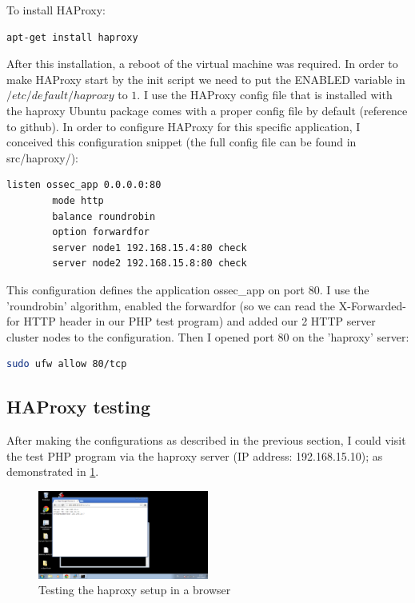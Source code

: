 \documentclass[12pt]{report}
\begin{document}
To install HAProxy:
\begin{lstlisting}[language=bash]
apt-get install haproxy
\end{lstlisting} 
After this installation, a reboot of the virtual machine was required.
In order to make HAProxy start by the init script we need to put the
ENABLED variable in $/etc/default/haproxy$ to $1$.
I use the HAProxy config file that is installed with the haproxy
Ubuntu package comes with a proper config file by default (reference
to github).   
In order to configure HAProxy for this specific application, I conceived
this configuration snippet (the full config file can be found in src/haproxy/):
\begin{lstlisting}[language=bash]
listen ossec_app 0.0.0.0:80
        mode http
        balance roundrobin
        option forwardfor
        server node1 192.168.15.4:80 check
        server node2 192.168.15.8:80 check
\end{lstlisting} 
This configuration defines the application ossec\_app on port 80.
I use the 'roundrobin' algorithm, enabled the forwardfor (so we can read
the X-Forwarded-for HTTP header in our PHP test program) and added our 2
HTTP server cluster nodes to the configuration.
Then I opened port 80 on the 'haproxy' server:
\begin{lstlisting}[language=bash]
  sudo ufw allow 80/tcp
\end{lstlisting} 

\subsection{HAProxy testing}
After making the configurations as described in the previous section, I could visit the test PHP program via the
haproxy server (IP address: 192.168.15.10); as demonstrated in \ref{fig:haproxy_working_browser}.

\begin{figure}[h!]
  \caption{Testing the haproxy setup in a browser}
  \label{fig:haproxy_working_browser}
  \centering
    \includegraphics[width=0.5\textwidth]{pics/haproxy_working_browser.png}
\end{figure}
\end{document}
